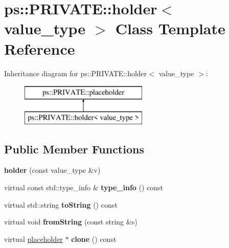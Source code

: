 \hypertarget{classps_1_1PRIVATE_1_1holder}{}\section{ps\+:\+:P\+R\+I\+V\+A\+T\+E\+:\+:holder$<$ value\+\_\+type $>$ Class Template Reference}
\label{classps_1_1PRIVATE_1_1holder}
Inheritance diagram for ps\+:\+:P\+R\+I\+V\+A\+T\+E\+:\+:holder$<$ value\+\_\+type $>$\+:\begin{figure}[H]
\begin{center}
\leavevmode
\includegraphics[height=2.000000cm]{classps_1_1PRIVATE_1_1holder}
\end{center}
\end{figure}
\subsection*{Public Member Functions}
\begin{DoxyCompactItemize}
\item 
\hypertarget{classps_1_1PRIVATE_1_1holder_a6ec3b7ccb33bad56c2181e0f68fa720b}{}{\bfseries holder} (const value\+\_\+type \&v)\label{classps_1_1PRIVATE_1_1holder_a6ec3b7ccb33bad56c2181e0f68fa720b}

\item 
\hypertarget{classps_1_1PRIVATE_1_1holder_a009fc3160cc8b3fd33e0b191632132b0}{}virtual const std\+::type\+\_\+info \& {\bfseries type\+\_\+info} () const \label{classps_1_1PRIVATE_1_1holder_a009fc3160cc8b3fd33e0b191632132b0}

\item 
\hypertarget{classps_1_1PRIVATE_1_1holder_a65ecbdebbf333cb8bf5c57f2b05a040d}{}virtual std\+::string {\bfseries to\+String} () const \label{classps_1_1PRIVATE_1_1holder_a65ecbdebbf333cb8bf5c57f2b05a040d}

\item 
\hypertarget{classps_1_1PRIVATE_1_1holder_a7695cacb686b48d794ebb9f3c80868f1}{}virtual void {\bfseries from\+String} (const string \&s)\label{classps_1_1PRIVATE_1_1holder_a7695cacb686b48d794ebb9f3c80868f1}

\item 
\hypertarget{classps_1_1PRIVATE_1_1holder_a2b3d976f5ea886f716c6cc529a420f0e}{}virtual \hyperlink{classps_1_1PRIVATE_1_1placeholder}{placeholder} $\ast$ {\bfseries clone} () const \label{classps_1_1PRIVATE_1_1holder_a2b3d976f5ea886f716c6cc529a420f0e}

\end{DoxyCompactItemize}
